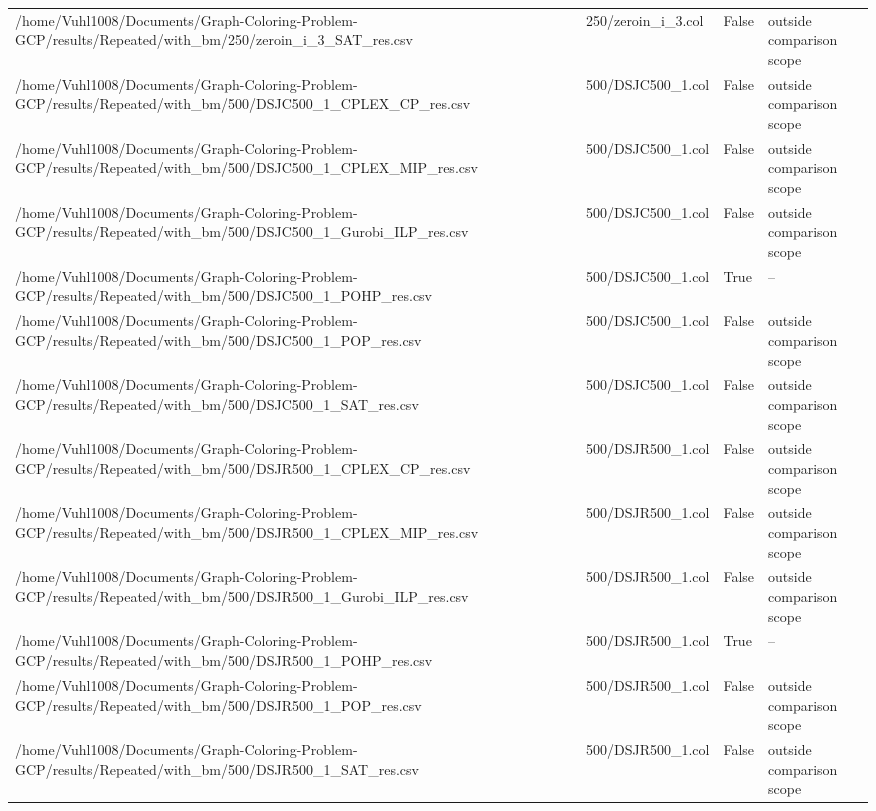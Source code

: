 \begin{table}[htbp]
\begin{tabular}{llll}
/home/Vuhl1008/Documents/Graph-Coloring-Problem-GCP/results/Repeated/with\_bm/250/zeroin\_i\_3\_SAT\_res.csv & 250/zeroin\_i\_3.col & False & outside comparison scope \\
/home/Vuhl1008/Documents/Graph-Coloring-Problem-GCP/results/Repeated/with\_bm/500/DSJC500\_1\_CPLEX\_CP\_res.csv & 500/DSJC500\_1.col & False & outside comparison scope \\
/home/Vuhl1008/Documents/Graph-Coloring-Problem-GCP/results/Repeated/with\_bm/500/DSJC500\_1\_CPLEX\_MIP\_res.csv & 500/DSJC500\_1.col & False & outside comparison scope \\
/home/Vuhl1008/Documents/Graph-Coloring-Problem-GCP/results/Repeated/with\_bm/500/DSJC500\_1\_Gurobi\_ILP\_res.csv & 500/DSJC500\_1.col & False & outside comparison scope \\
/home/Vuhl1008/Documents/Graph-Coloring-Problem-GCP/results/Repeated/with\_bm/500/DSJC500\_1\_POHP\_res.csv & 500/DSJC500\_1.col & True & -- \\
/home/Vuhl1008/Documents/Graph-Coloring-Problem-GCP/results/Repeated/with\_bm/500/DSJC500\_1\_POP\_res.csv & 500/DSJC500\_1.col & False & outside comparison scope \\
/home/Vuhl1008/Documents/Graph-Coloring-Problem-GCP/results/Repeated/with\_bm/500/DSJC500\_1\_SAT\_res.csv & 500/DSJC500\_1.col & False & outside comparison scope \\
/home/Vuhl1008/Documents/Graph-Coloring-Problem-GCP/results/Repeated/with\_bm/500/DSJR500\_1\_CPLEX\_CP\_res.csv & 500/DSJR500\_1.col & False & outside comparison scope \\
/home/Vuhl1008/Documents/Graph-Coloring-Problem-GCP/results/Repeated/with\_bm/500/DSJR500\_1\_CPLEX\_MIP\_res.csv & 500/DSJR500\_1.col & False & outside comparison scope \\
/home/Vuhl1008/Documents/Graph-Coloring-Problem-GCP/results/Repeated/with\_bm/500/DSJR500\_1\_Gurobi\_ILP\_res.csv & 500/DSJR500\_1.col & False & outside comparison scope \\
/home/Vuhl1008/Documents/Graph-Coloring-Problem-GCP/results/Repeated/with\_bm/500/DSJR500\_1\_POHP\_res.csv & 500/DSJR500\_1.col & True & -- \\
/home/Vuhl1008/Documents/Graph-Coloring-Problem-GCP/results/Repeated/with\_bm/500/DSJR500\_1\_POP\_res.csv & 500/DSJR500\_1.col & False & outside comparison scope \\
/home/Vuhl1008/Documents/Graph-Coloring-Problem-GCP/results/Repeated/with\_bm/500/DSJR500\_1\_SAT\_res.csv & 500/DSJR500\_1.col & False & outside comparison scope \\

\end{tabular}
\end{table}
